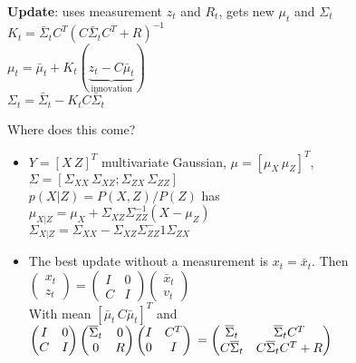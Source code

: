 \textbf{Update}: uses measurement $z_t$ and $R_t$, gets new $\mu_t$ and
$\Sigma_t$\\
$K_t = \bar{\Sigma}_t C^T (C \bar{\Sigma}_t C^T + R)^{-1}$ \\
$\mu_t = \bar{\mu}_t + K_t (\underbrace{z_t - C
\bar{\mu}_t}_{\text{innovation}})$ \\
$\Sigma_t = \bar{\Sigma}_t - K_t C \bar{\Sigma}_t$

Where does this come?
\begin{itemize}
  \item 
  $Y = [X \, Z]^T$ multivariate Gaussian, $\mu = [\mu_X \, \mu_Z]^T$,\\
  $\Sigma = [\Sigma_{XX} \, \Sigma_{XZ}; \Sigma_{ZX} \, \Sigma_{ZZ}]$\\
  $p(X|Z) = P(X, Z)/P(Z)$ has \\
  $\mu_{X|Z} = \mu_X + \Sigma_{XZ} \Sigma_{ZZ}^{-1}(X - \mu_Z)$\\
  $\Sigma_{X|Z} = \Sigma_{XX} - \Sigma_{XZ} \Sigma_{ZZ}^-1 \Sigma_{ZX}$
\item The best update without a measurement is $x_t = \bar{x}_t$. Then\\
  $\begin{pmatrix}x_t \\ z_t\end{pmatrix} = 
  \begin{pmatrix}I & 0\\ C & I\end{pmatrix}
  \begin{pmatrix}\bar{x}_t \\ v_t\end{pmatrix}$ \\
  With mean  $[\bar{\mu}_t \, C\bar{\mu}_t]^T$ and
  $
  \begin{pmatrix}
    I & 0 \\ C & I
  \end{pmatrix}
  \begin{pmatrix}
    \bar{\Sigma}_t & 0 \\ 0 & R
  \end{pmatrix}
  \begin{pmatrix}
    I & C^T \\ 0 & I
  \end{pmatrix}\\
  =
  \begin{pmatrix}
    \bar{\Sigma}_t & \bar{\Sigma}_t C^T \\
    C \bar{\Sigma}_t & C \bar{\Sigma}_t C^T + R
  \end{pmatrix}
  $
\end{itemize}

